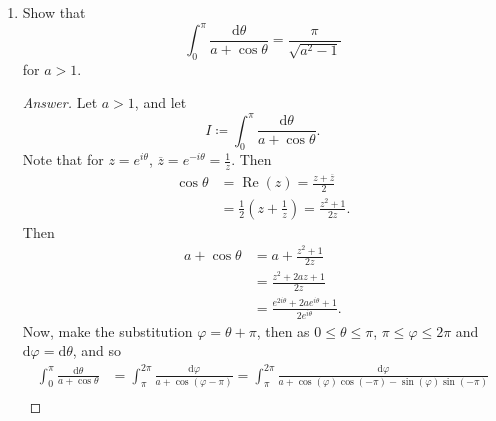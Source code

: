\documentclass[12pt]{article}
\newcommand\paren[1]{\left( #1 \right)}
\theoremstyle{definition}
\DeclareMathOperator\re{Re}
\begin{document}
\begin{enumerate}
\begin{proof}[Answer]
        \begin{align*}
            0 & = \lim\limits_{r \to 0} \int_{\gamma_r} \frac{ e^{iz} - 1 }{ z } \, \mathrm{d}r = \lim\limits_{r \to 0} \paren{ \int_{\gamma_r} \frac{e^{iz}}{z} \, \mathrm{d}z - \int_{\gamma_r} \frac{ \mathrm{d}z }{ z } } \\
            & = \lim\limits_{r \to 0} \int_{\gamma_r} \frac{e^{iz}}{z} \, \mathrm{d}z + \pi i , \\
            \lim\limits_{r \to 0} \int_{\gamma_r} \frac{e^{iz}}{z} \, \mathrm{d}z & = -\pi i.
        \end{align*}
        Finally, take the limit $r \to 0$ and $R \to \infty$ of 
        \[
            \int_r^R \frac{ \sin x}{x} \, \mathrm{d}x = -\frac{1}{2i} \paren{ \int_{\gamma_R} \frac{e^{iz}}{z} \, \mathrm{d}z + \int_{\gamma_r} \frac{e^{iz}}{z} \, \mathrm{d}z }
        \]
        to get
        \[
            \int_0^{\infty} \frac{ \sin x}{x} \, \mathrm{d}x = -\frac{1}{2i} \paren{ 0 - \pi } = \boxed{ \frac{\pi}{2} . }
        \]
    \end{proof}
    \item Show that 
    \[
        \int_0^{\pi} \frac{\mathrm{d}\theta}{a + \cos \theta} = \frac{\pi}{\sqrt{a^2-1}}
    \]
    for $a > 1$.
    \begin{proof}[Answer]
        Let $a > 1$, and let 
        \[
            I \coloneqq \int_0^{\pi} \frac{\mathrm{d}\theta}{a + \cos \theta}.
        \]
        Note that for $z = e^{i\theta}$, $\overline{z} = e^{-i \theta} = \frac{1}{z}$. Then 
        \begin{align*}
            \cos \theta & = \re(z) = \frac{z + \overline{z}}{2} \\
            & = \frac{1}{2} \paren{ z + \frac{1}{z} } = \frac{z^2 + 1}{2z}.
        \end{align*}
        Then 
        \begin{align*}
            a + \cos \theta & = a + \frac{z^2 + 1}{2z} \\
            & = \frac{z^2 + 2az + 1}{2z} \\
            & = \frac{e^{2i\theta} + 2ae^{i\theta} + 1}{2e^{i\theta}}.
        \end{align*}
        Now, make the substitution $\varphi = \theta + \pi$, then as $0 \leq \theta \leq \pi$, $\pi \leq \varphi \leq 2\pi$ and $\mathrm{d}\varphi = \mathrm{d}\theta$, and so 
        \begin{align*}
            \int_0^{\pi} \frac{\mathrm{d}\theta}{a + \cos \theta} & = \int_{\pi}^{2\pi} \frac{\mathrm{d}\varphi}{a + \cos(\varphi-\pi)} = \int_{\pi}^{2\pi} \frac{\mathrm{d}\varphi}{a + \cos(\varphi)\cos(-\pi) - \sin(\varphi)\sin(-\pi)} \\ 

\end{align*}
\end{proof}
\end{enumerate}
\end{document}
